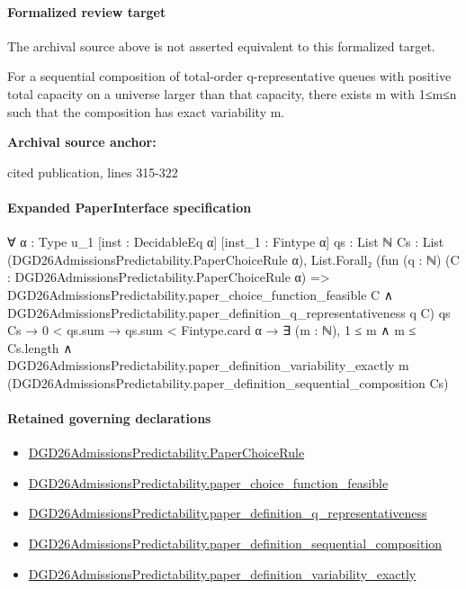 \documentclass[10pt]{article}
\begin{document}
\paragraph{Formalized review target}
The archival source above is not asserted equivalent to this formalized target.
\begin{ReviewVerbatim}
For a sequential composition of total-order q-representative queues with positive total capacity on a universe larger than that capacity, there exists m with 1≤m≤n such that the composition has exact variability m.
\end{ReviewVerbatim}

\textbf{Archival source anchor:} {\footnotesize\raggedright cited publication, lines 315-\allowbreak{}322\par}
\paragraph{Expanded PaperInterface specification}
\begin{ReviewVerbatim}
∀ {α : Type u_1} [inst : DecidableEq α] [inst_1 : Fintype α] {qs : List ℕ}
  {Cs : List (DGD26AdmissionsPredictability.PaperChoiceRule α)},
  List.Forall₂
      (fun (q : ℕ) (C : DGD26AdmissionsPredictability.PaperChoiceRule α) =>
        DGD26AdmissionsPredictability.paper_choice_function_feasible C ∧
          DGD26AdmissionsPredictability.paper_definition_q_representativeness q C)
      qs Cs →
    0 < qs.sum →
      qs.sum < Fintype.card α →
        ∃ (m : ℕ),
          1 ≤ m ∧
            m ≤ Cs.length ∧
              DGD26AdmissionsPredictability.paper_definition_variability_exactly m
                (DGD26AdmissionsPredictability.paper_definition_sequential_composition Cs)
\end{ReviewVerbatim}

\paragraph{Retained governing declarations}
\begin{itemize}\raggedright
\item \hyperlink{governing-declaration-4678951b4432b184}{DGD26\allowbreak{}Admissions\allowbreak{}Predictability.\allowbreak{}Paper\allowbreak{}Choice\allowbreak{}Rule}
\item \hyperlink{governing-declaration-f7de74a44053f6d5}{DGD26\allowbreak{}Admissions\allowbreak{}Predictability.\allowbreak{}paper\_\allowbreak{}choice\_\allowbreak{}function\_\allowbreak{}feasible}
\item \hyperlink{governing-declaration-1099c3b9d08feae8}{DGD26\allowbreak{}Admissions\allowbreak{}Predictability.\allowbreak{}paper\_\allowbreak{}definition\_\allowbreak{}q\_\allowbreak{}representativeness}
\item \hyperlink{governing-declaration-c10b5862fabcb2c0}{DGD26\allowbreak{}Admissions\allowbreak{}Predictability.\allowbreak{}paper\_\allowbreak{}definition\_\allowbreak{}sequential\_\allowbreak{}composition}
\item \hyperlink{governing-declaration-ce6697be3f1c2256}{DGD26\allowbreak{}Admissions\allowbreak{}Predictability.\allowbreak{}paper\_\allowbreak{}definition\_\allowbreak{}variability\_\allowbreak{}exactly}
\end{itemize}
\end{document}

